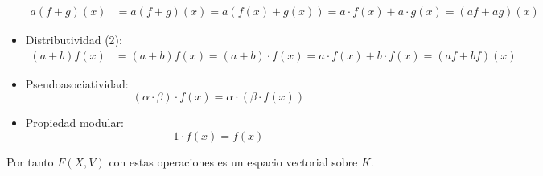 \begin{ejercicio}
\begin{itemize}
		      \begin{align*}
			      a(f+g)(x) & = a(f+g)(x) = a(f(x) + g(x)) = a \cdot f(x) + a \cdot g(x) = (af + ag)(x)
		      \end{align*}
		\item Distributividad (2):
		      \begin{align*}
			      (a+b)f(x) & = (a+b)f(x) = (a+b) \cdot f(x) = a \cdot f(x) + b \cdot f(x) = (af + bf)(x)
		      \end{align*}
		\item Pseudoasociatividad:
		      \begin{equation*}
			      (   \alpha \cdot \beta) \cdot f(x) = \alpha \cdot (\beta \cdot f(x))
		      \end{equation*}
		\item Propiedad modular:
		      \begin{equation*}
			      1 \cdot f(x) = f(x)
		      \end{equation*}
	\end{itemize}

	Por tanto   $F(X,V)$ con estas operaciones es un espacio vectorial sobre $K$.
\end{ejercicio}


